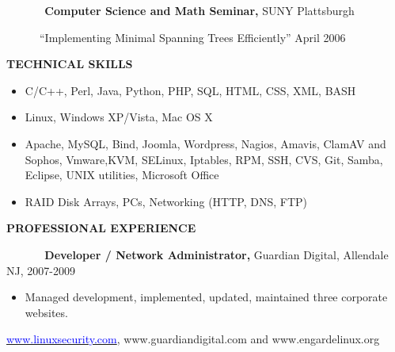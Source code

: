 \documentclass{article}
\newcommand\textstyleInternetlink[1]{\textcolor{blue}{#1}}
\newcommand\liststyleWWviiiNumvi{%
\renewcommand\labelitemi{[F0B7?]}
\renewcommand\labelitemii{${\circ}$}
\renewcommand\labelitemiii{${\blacksquare}$}
\renewcommand\labelitemiv{[F0B7?]}
}
\newcommand\liststyleWWviiiNumvii{%
\renewcommand\labelitemi{[F0B7?]}
\renewcommand\labelitemii{${\circ}$}
\renewcommand\labelitemiii{${\blacksquare}$}
\renewcommand\labelitemiv{[F0B7?]}
}
\newcommand\liststyleWWviiiNumv{%
\renewcommand\labelitemi{[F0B7?]}
\renewcommand\labelitemii{${\circ}$}
\renewcommand\labelitemiii{${\blacksquare}$}
\renewcommand\labelitemiv{[F0B7?]}
}
\newcommand\liststyleWWviiiNumii{%
\renewcommand\labelitemi{[F0B7?]}
\renewcommand\labelitemii{[F081?]}
\renewcommand\labelitemiii{${\blacksquare}$}
\renewcommand\labelitemiv{[F06C?]}
}
\begin{document}
\bigskip

{\sffamily
\textbf{\ \ \ \ \ \ Computer Science and Math Seminar, }SUNY
Plattsburgh}

{\sffamily
\ \ \ \ \ \ {\textquotedblleft}Implementing Minimal Spanning Trees
Efficiently{\textquotedblright} April 2006 \ \ }


\bigskip

{\sffamily\bfseries
TECHNICAL SKILLS}


\bigskip

\liststyleWWviiiNumvi
\begin{itemize}
\item {\sffamily
C/C++, Perl, Java, Python, PHP, SQL, HTML, CSS, XML, BASH}
\end{itemize}
\liststyleWWviiiNumvii
\begin{itemize}
\item {\sffamily
Linux, Windows XP/Vista, Mac OS X}
\item {\sffamily
Apache, MySQL, Bind, Joomla, Wordpress, Nagios, Amavis, ClamAV and
Sophos, Vmware,KVM, SELinux, Iptables, RPM, SSH, CVS, Git, Samba,
Eclipse, UNIX utilities, Microsoft Office}
\end{itemize}
\liststyleWWviiiNumv
\begin{itemize}
\item {\sffamily
RAID Disk Arrays, PC{\textquotesingle}s, Networking (HTTP, DNS, FTP)}
\end{itemize}

\bigskip

{\sffamily\bfseries
PROFESSIONAL EXPERIENCE}


\bigskip

{\sffamily
\textbf{\ \ \ \ \ \ Developer / Network Administrator, }Guardian
Digital, Allendale NJ, 2007-2009  }

\liststyleWWviiiNumii
\begin{itemize}
\item {\sffamily
Managed development, implemented, updated, maintained three corporate
websites.}
\end{itemize}
{\sffamily
\href{http://www.linuxsecurity.com/}{\textstyleInternetlink{www.linuxsecurity.com}},
www.guardiandigital.com and www.engardelinux.org}
\end{document}
